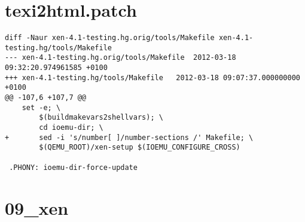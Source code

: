 \section{texi2html.patch}
\begin{lstlisting}
diff -Naur xen-4.1-testing.hg.orig/tools/Makefile xen-4.1-testing.hg/tools/Makefile
--- xen-4.1-testing.hg.orig/tools/Makefile	2012-03-18 09:32:20.974961585 +0100
+++ xen-4.1-testing.hg/tools/Makefile	2012-03-18 09:07:37.000000000 +0100
@@ -107,6 +107,7 @@
 	set -e; \
 		$(buildmakevars2shellvars); \
 		cd ioemu-dir; \
+		sed -i 's/number[ ]/number-sections /' Makefile; \
 		$(QEMU_ROOT)/xen-setup $(IOEMU_CONFIGURE_CROSS)
 
 .PHONY: ioemu-dir-force-update
\end{lstlisting}

\section{09\_xen}
